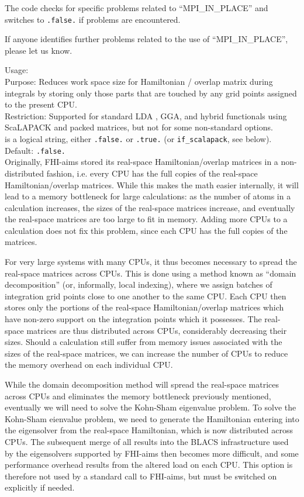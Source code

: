The code checks for specific problems related to ``MPI\_IN\_PLACE'' and switches to
 \texttt{.false.} if problems are encountered.

If anyone identifies further problems related to the use of ``MPI\_IN\_PLACE'',
please let us know. 

{
  \noindent
  Usage:   \\[1.0ex]
  Purpose: Reduces work space size for Hamiltonian / overlap matrix
    during integrals by storing only those parts that are touched by
    any grid points assigned to the present CPU. \\[1.0ex]
  Restriction: Supported for standard LDA , GGA, and hybrid functionals using
    ScaLAPACK and packed matrices, but not for some non-standard options.
    \\[1.0ex]
   is a logical string, either \texttt{.false.} or
    \texttt{.true.} (or \texttt{if\_scalapack}, see below). Default: \texttt{.false.} \\
}
Originally, FHI-aims stored its real-space Hamiltonian/overlap matrices in a
non-distributed fashion, i.e. every CPU has the full copies of the real-space
Hamiltonian/overlap matrices.  While this makes the math easier internally, it
will lead to a memory bottleneck for large calculations:  as the number of atoms
in a calculation increases, the sizes of the real-space matrices increase, and
eventually the real-space matrices are too large to fit in memory.  Adding more
CPUs to a calculation does not fix this problem, since each CPU has the full
copies of the matrices.

For very large systems with many CPUs, it thus becomes necessary to spread the
real-space matrices across CPUs.  This is done using a method known as
``domain decomposition'' (or, informally, local indexing), where we
assign batches of integration grid points close to one another to the same CPU.
Each CPU then stores only the portions of the real-space Hamiltonian/overlap
matrices which have non-zero support on the integration points which it possesses.
The real-space matrices are thus distributed across CPUs, considerably
decreasing their sizes.  Should a calculation still suffer from memory issues
associated with the sizes of the real-space matrices, we can increase the
number of CPUs to reduce the memory overhead on each individual CPU.

While the domain decomposition method will spread the real-space matrices across
CPUs and eliminates the memory bottleneck previously mentioned, eventually we
will need to solve the Kohn-Sham eigenvalue problem.  To solve the Kohn-Sham
eienvalue problem, we need to generate the Hamiltonian entering into the
eigensolver from the real-space Hamiltonian, which is now distributed across
CPUs.  The subsequent merge of all results into the BLACS infrastructure used by
the eigensolvers supported by FHI-aims then becomes more difficult, and some
performance overhead results from the altered load on each CPU.  This option is
therefore not used by a standard call to FHI-aims, but must be switched on
explicitly if needed.

